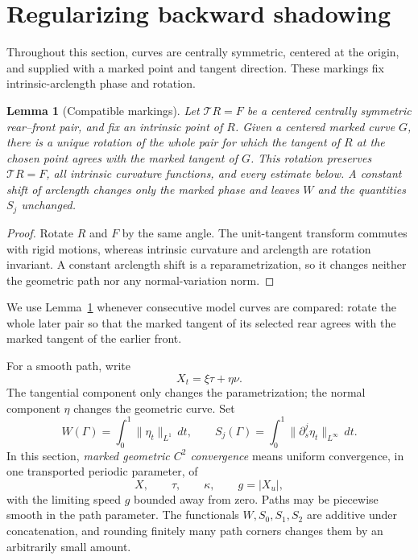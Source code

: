 \documentclass[11pt]{article}
\newtheorem{lemma}[theorem]{Lemma}
\theoremstyle{remark}
\newcommand{\Tmap}{\mathcal T}
\newcommand{\norm}[1]{\lVert #1\rVert}
\begin{document}
\section{Regularizing backward shadowing}\label{sec:shadow}

Throughout this section, curves are centrally symmetric, centered at the
origin, and supplied with a marked point and tangent direction.  These
markings fix intrinsic-arclength phase and rotation.

\begin{lemma}[Compatible markings]\label{lem:compatible-markings}
Let \(\Tmap R=F\) be a centered centrally symmetric rear--front pair, and
fix an intrinsic point of \(R\).  Given a centered marked curve \(G\), there
is a unique rotation of the whole pair for which the tangent of \(R\) at the
chosen point agrees with the marked tangent of \(G\).  This rotation preserves
\(\Tmap R=F\), all intrinsic curvature functions, and every estimate below.
A constant shift of arclength changes only the marked phase and leaves
\(W\) and the quantities \(S_j\) unchanged.
\end{lemma}

\begin{proof}
Rotate \(R\) and \(F\) by the same angle.  The unit-tangent transform
commutes with rigid motions, whereas intrinsic curvature and arclength are
rotation invariant.  A constant arclength shift is a reparametrization, so it
changes neither the geometric path nor any normal-variation norm.
\end{proof}

We use Lemma~\ref{lem:compatible-markings} whenever consecutive model curves
are compared: rotate the whole later pair so that the marked tangent of its
selected rear agrees with the marked tangent of the earlier front.

For a smooth path, write
\[
  X_t=\xi\tau+\eta\nu.
\]
The tangential component only changes the parametrization; the normal
component \(\eta\) changes the geometric curve.  Set
\[
  W(\Gamma)=\int_0^1\norm{\eta_t}_{L^1}\,dt,
  \qquad
  S_j(\Gamma)=\int_0^1\norm{\partial_s^j\eta_t}_{L^\infty}\,dt.
\]
In this section, \emph{marked geometric \(C^2\) convergence} means uniform
convergence, in one transported periodic parameter, of
\[
   X,\qquad \tau,\qquad \kappa,\qquad g=|X_u|,
\]
with the limiting speed \(g\) bounded away from zero.  Paths may be piecewise
smooth in the path parameter.  The functionals \(W,S_0,S_1,S_2\) are
additive under concatenation, and rounding finitely many path corners changes
them by an arbitrarily small amount.
\end{document}
